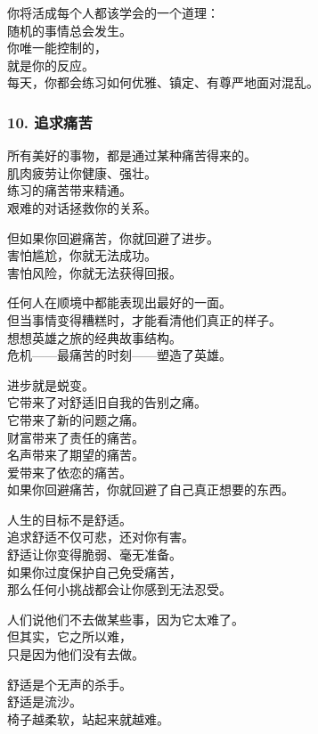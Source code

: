\documentclass[
]{article}
\begin{document}
你将活成每个人都该学会的一个道理：\\
随机的事情总会发生。\\
你唯一能控制的，\\
就是你的反应。\\
每天，你都会练习如何优雅、镇定、有尊严地面对混乱。

\subsubsection{10. 追求痛苦}\label{10-ux8ffdux6c42ux75dbux82e6}

所有美好的事物，都是通过某种痛苦得来的。\\
肌肉疲劳让你健康、强壮。\\
练习的痛苦带来精通。\\
艰难的对话拯救你的关系。

但如果你回避痛苦，你就回避了进步。\\
害怕尴尬，你就无法成功。\\
害怕风险，你就无法获得回报。

任何人在顺境中都能表现出最好的一面。\\
但当事情变得糟糕时，才能看清他们真正的样子。\\
想想英雄之旅的经典故事结构。\\
危机------最痛苦的时刻------塑造了英雄。

进步就是蜕变。\\
它带来了对舒适旧自我的告别之痛。\\
它带来了新的问题之痛。\\
财富带来了责任的痛苦。\\
名声带来了期望的痛苦。\\
爱带来了依恋的痛苦。\\
如果你回避痛苦，你就回避了自己真正想要的东西。

人生的目标不是舒适。\\
追求舒适不仅可悲，还对你有害。\\
舒适让你变得脆弱、毫无准备。\\
如果你过度保护自己免受痛苦，\\
那么任何小挑战都会让你感到无法忍受。

人们说他们不去做某些事，因为它太难了。\\
但其实，它之所以难，\\
只是因为他们没有去做。

舒适是个无声的杀手。\\
舒适是流沙。\\
椅子越柔软，站起来就越难。
\end{document}
